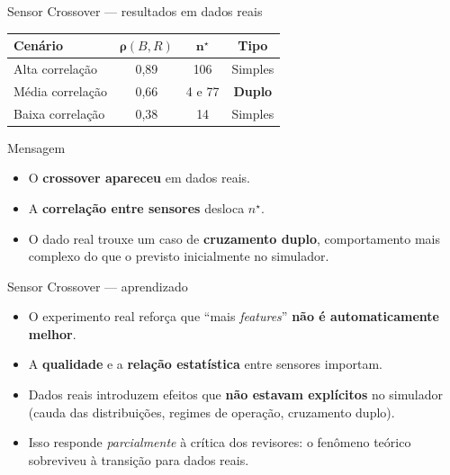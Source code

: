 \documentclass[aspectratio=169, 11pt]{beamer}
\begin{document}
\begin{frame}{Sensor Crossover --- resultados em dados reais}

\begin{center}
\small
\begin{tabular}{@{}lccc@{}}
  \toprule
  \textbf{Cenário} & $\boldsymbol{\rho}(B,R)$ & $\mathbf{n^{\star}}$ & \textbf{Tipo} \\
  \midrule
  Alta correlação  & 0{,}89 & 106     & Simples \\
  Média correlação & 0{,}66 & 4 e 77  & \textcolor{redbad}{\textbf{Duplo}} \\
  Baixa correlação & 0{,}38 & 14      & Simples \\
  \bottomrule
\end{tabular}
\end{center}

\vspace{0.6em}
\begin{exampleblock}{Mensagem}
\begin{itemize}
  \item O \textbf{crossover apareceu} em dados reais.
  \item A \textbf{correlação entre sensores} desloca $n^{\star}$.
  \item O dado real trouxe um caso de \textbf{cruzamento duplo},
        comportamento mais complexo do que o previsto inicialmente
        no simulador.
\end{itemize}
\end{exampleblock}

\end{frame}

\begin{frame}{Sensor Crossover --- aprendizado}

\begin{itemize}
  \item O experimento real reforça que ``mais \textit{features}''
        \textbf{não é automaticamente melhor}.
  \item A \textbf{qualidade} e a \textbf{relação estatística}
        entre sensores importam.
  \item Dados reais introduzem efeitos que \textbf{não estavam explícitos}
        no simulador (cauda das distribuições, regimes de operação,
        cruzamento duplo).
  \item Isso responde \emph{parcialmente} à crítica dos revisores:
        o fenômeno teórico sobreviveu à transição para dados reais.
\end{itemize}

\end{frame}
\end{document}
